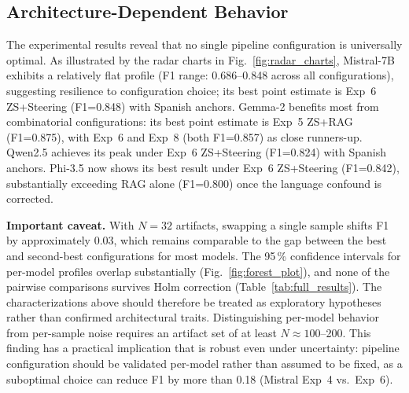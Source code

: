 \documentclass{ieeeaccess}
\begin{document}
\subsection{Architecture-Dependent Behavior}

The experimental results reveal that no single pipeline configuration is universally optimal. As illustrated by the radar charts in Fig.~\ref{fig:radar_charts}, Mistral-7B exhibits a relatively flat profile (F1 range: 0.686--0.848 across all configurations), suggesting resilience to configuration choice; its best point estimate is Exp~6 ZS+Steering (F1=0.848) with Spanish anchors. Gemma-2 benefits most from combinatorial configurations: its best point estimate is Exp~5 ZS+RAG (F1=0.875), with Exp~6 and Exp~8 (both F1=0.857) as close runners-up. Qwen2.5 achieves its peak under Exp~6 ZS+Steering (F1=0.824) with Spanish anchors. Phi-3.5 now shows its best result under Exp~6 ZS+Steering (F1=0.842), substantially exceeding RAG alone (F1=0.800) once the language confound is corrected.

\textbf{Important caveat.} With $N=32$ artifacts, swapping a single sample shifts F1 by approximately 0.03, which remains comparable to the gap between the best and second-best configurations for most models. The 95\,\% confidence intervals for per-model profiles overlap substantially (Fig.~\ref{fig:forest_plot}), and none of the pairwise comparisons survives Holm correction (Table~\ref{tab:full_results}). The characterizations above should therefore be treated as exploratory hypotheses rather than confirmed architectural traits. Distinguishing per-model behavior from per-sample noise requires an artifact set of at least $N \approx 100$--200. This finding has a practical implication that is robust even under uncertainty: pipeline configuration should be validated per-model rather than assumed to be fixed, as a suboptimal choice can reduce F1 by more than 0.18 (Mistral Exp~4 vs.\ Exp~6).
\end{document}
